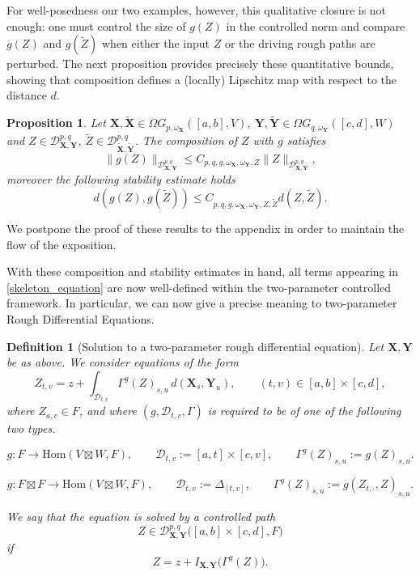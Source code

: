 \documentclass{article}%
\newtheorem{definition}[theorem]{Definition}
\newtheorem{proposition}[theorem]{Proposition}
\begin{document}
For well-posedness our two examples, however, this qualitative closure is not enough:  one must control the size of $g(Z)$ in the controlled norm and compare $g(Z)$ and $g(\tilde Z)$ when either the input $Z$ or the driving rough paths are perturbed.  
The next proposition provides precisely these quantitative bounds, showing that composition defines a (locally) Lipschitz map with respect to the distance $d$.
\begin{proposition}\label{stability_proposition}
    Let $\mathbf{X}, \tilde{\mathbf{X}} \in \Omega G_{p, \omega_\mathbf{X}}([a,b], V)$, $\mathbf{Y}, \tilde{\mathbf{Y}} \in \Omega G_{q, \omega_\mathbf{Y}}([c,d], W)$ and  $Z \in \mathcal{D}^{p,q}_{\mathbf{X},\mathbf{Y}}$, $\tilde{Z} \in \mathcal{D}^{p,q}_{\tilde{\mathbf{X}},\tilde{\mathbf{Y}}}$. The composition of $Z$ with $g$ satisfies 
    \[
    \|g(Z)\|_{\mathcal{D}^{p,q}_{\mathbf{X}, \mathbf{Y}}} \leq C_{p,q,g,\omega_\mathbf{X}, \omega_\mathbf{Y}, Z} \|Z\|_{\mathcal{D}^{p,q}_{\mathbf{X}, \mathbf{Y}}},
    \]
    moreover the following stability estimate holds
    \[
    d(g(Z), g(\tilde{Z})) \leq C_{p,q,g,\omega_\mathbf{X}, \omega_\mathbf{Y}, Z, \tilde{Z}} d(Z, \tilde{Z}).
    \]


\end{proposition}

We postpone the proof of these results to the appendix in order to maintain the flow of the exposition.\newline

With these composition and stability estimates in hand, all terms appearing in \eqref{skeleton_equation} are now well-defined within the two-parameter controlled framework. In particular, we can now give a precise meaning to two-parameter Rough Differential Equations.


\begin{definition}[Solution to a two-parameter rough differential equation]
\label{solution_2d_RDE}
Let $\mathbf{X},\mathbf{Y}$ be as above. We consider equations of the form
\[
Z_{t,v}
=
z
+
\int_{\mathcal D_{t,v}}
\Gamma^{g}(Z)_{s,u}\,d(\mathbf X_s,\mathbf Y_u),
\qquad (t,v)\in [a,b]\times[c,d],
\]
where $Z_{a,c}\in F$, and where $(g,\mathcal D_{t,v},\Gamma)$ is required to be of one of the following two types.

\smallskip
{}
\[
g:F\to \mathrm{Hom}(V\boxtimes W,F),
\qquad
\mathcal D_{t,v}:=[a,t]\times[c,v], \qquad 
\Gamma^{g}(Z)_{s,u}:=g(Z)_{s,u}.
\]


\smallskip
{}
\[
g:F\boxtimes F\to \mathrm{Hom}(V\boxtimes W,F),
\qquad
\mathcal D_{t,v}:=\Delta_{[t,v]},
\qquad
\Gamma^{g}(Z)_{s,u}:=g(Z_{t, \cdot},Z)_{s,u}.
\]

We say that the equation is solved by a controlled path
\[
Z\in \mathcal D^{p,q}_{\mathbf X,\mathbf Y}\big([a,b]\times[c,d],F\big)
\]
if
\[
Z= z +I_{\mathbf X,\mathbf Y}\big(\Gamma^{g}(Z)\big).
\]
\end{definition}
\end{document}
